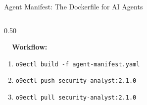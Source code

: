 \begin{frame}[fragile]{\fontsize{10}{12}\selectfont Agent Manifest: The Dockerfile for AI Agents}
\begin{columns}[T]
\begin{column}{0.50\textwidth}
      \vspace{0.1cm}

      \fontsize{5}{6}\selectfont
      \textbf{\ \ Workflow:}
      \begin{enumerate}
        \setlength{\itemsep}{0pt}
        \item \texttt{o9ectl build -f agent-manifest.yaml}
        \item \texttt{o9ectl push security-analyst:2.1.0}
        \item \texttt{o9ectl pull security-analyst:2.1.0}
      \end{enumerate}
    \end{column}
  \end{columns}
\end{frame}
